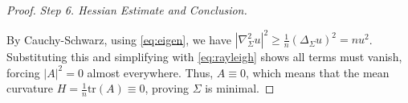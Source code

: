 \documentclass[10pt,a4paper]{amsart}
\begin{document}
\begin{proof}
\textit{Step 6. Hessian Estimate and Conclusion.}

By Cauchy-Schwarz, using \eqref{eq:eigen}, we have \(|\nabla^2_\Sigma u|^2 \geq \frac{1}{n} (\Delta_\Sigma u)^2 = n u^2\). Substituting this and simplifying with \eqref{eq:rayleigh} shows all terms must vanish, forcing \(|A|^2 = 0\) almost everywhere.
Thus, \(A \equiv 0\), which means that the mean curvature \(H = \frac{1}{n} \text{tr}(A) \equiv 0\), proving \(\Sigma\) is minimal.
\end{proof}
\end{document}
